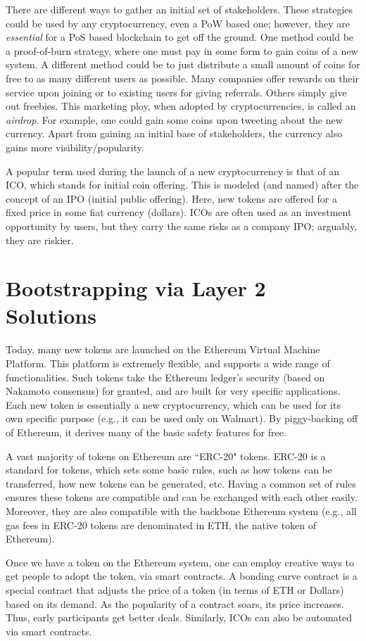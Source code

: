 \documentclass{article}
\begin{document}
There are different ways to gather an initial set of stakeholders. These strategies could be used by any cryptocurrency, even a PoW based one; however, they are {\em essential} for a PoS based blockchain to get off the ground. One method could be a proof-of-burn strategy, where one must pay in some form to gain coins of a new system. A different method could be to just distribute a small amount of coins for free to as many different users as possible. Many companies offer rewards on their service upon joining or to existing users for giving referrals. Others simply give out freebies. This marketing ploy, when adopted by cryptocurrencies, is called an \textit{airdrop}. For example, one could gain some coins upon tweeting about the new currency. Apart from gaining an initial base of stakeholders, the currency also gains more visibility/popularity.

A popular term used during the launch of a new cryptocurrency is that of an ICO, which stands for initial coin offering. This is modeled (and named) after the concept of an IPO (initial public offering). Here, new tokens are offered for a fixed price in some fiat currency (dollars). ICOs are often used as an investment opportunity by users, but they carry the same risks as a company IPO; arguably, they are riskier.

\section*{Bootstrapping via Layer 2 Solutions}
Today, many new tokens are launched on the Ethereum Virtual Machine Platform. This platform is extremely flexible, and supports a wide range of functionalities. Such tokens take the Ethereum ledger's security (based on Nakamoto consensus) for granted, and are built for very specific applications. Each new token is essentially a new cryptocurrency, which can be used for its own specific purpose (e.g., it can be used only on Walmart). By piggy-backing off of Ethereum, it derives many of the basic safety features for free. 

A vast majority of tokens on Ethereum are ``ERC-20" tokens. ERC-20 is a standard for tokens, which  sets some basic rules, such as how tokens can be transferred, how new tokens can be generated, etc. Having a common set of rules ensures these tokens are compatible and can be exchanged with each other easily. Moreover, they are also compatible with the backbone Ethereum system (e.g., all gas fees in ERC-20 tokens are denominated in ETH, the native token of Ethereum). 

Once we have a token on the Ethereum system, one can employ creative ways to get people to adopt the token, via smart contracts. A bonding curve contract is a special contract that adjusts the price of a token (in terms of ETH or Dollars) based on its demand. As the popularity of a contract soars, its price increases. Thus, early participants get better deals. Similarly, ICOs can also be automated via smart contracts.
\end{document}
